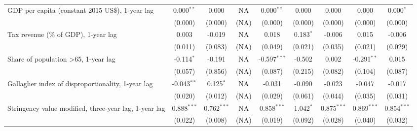 \begin{table}[htbp]
\begin{tabular}{lcccccccc}
      GDP per capita (constant 2015 US\$), 1-year lag                     & 0.000$^{**}$  & 0.000                     & NA           & 0.000$^{**}$   & 0.000            & 0.000           & 0.000           & 0.000$^{*}$\\   
                                                                          & (0.000)       & (0.000)                   & (NA)         & (0.000)        & (0.000)          & (0.000)         & (0.000)         & (0.000)\\   
      Tax revenue (\% of GDP), 1-year lag                                 & 0.003         & -0.019                    & NA           & 0.018          & 0.183$^{*}$      & -0.006          & 0.015           & -0.006\\   
                                                                          & (0.011)       & (0.083)                   & (NA)         & (0.049)        & (0.021)          & (0.035)         & (0.021)         & (0.029)\\   
      Share of population >65, 1-year lag                                 & -0.114$^{*}$  & -0.191                    & NA           & -0.597$^{***}$ & -0.502           & 0.002           & -0.291$^{**}$   & 0.015\\   
                                                                          & (0.057)       & (0.856)                   & (NA)         & (0.087)        & (0.215)          & (0.082)         & (0.104)         & (0.087)\\   
      Gallagher index of disproportionality, 1-year lag                   & -0.043$^{**}$ & 0.125$^{*}$               & NA           & -0.031         & -0.090           & -0.023          & -0.047          & -0.017\\   
                                                                          & (0.020)       & (0.012)                   & (NA)         & (0.029)        & (0.061)          & (0.044)         & (0.035)         & (0.031)\\   
      Stringency value modified, three-year lag, 1-year lag               & 0.888$^{***}$ & 0.762$^{***}$             & NA           & 0.858$^{***}$  & 1.042$^{*}$      & 0.875$^{***}$   & 0.869$^{***}$   & 0.854$^{***}$\\   
                                                                          & (0.022)       & (0.008)                   & (NA)         & (0.019)        & (0.092)          & (0.028)         & (0.040)         & (0.032)\\   

\end{tabular}
\end{table}

